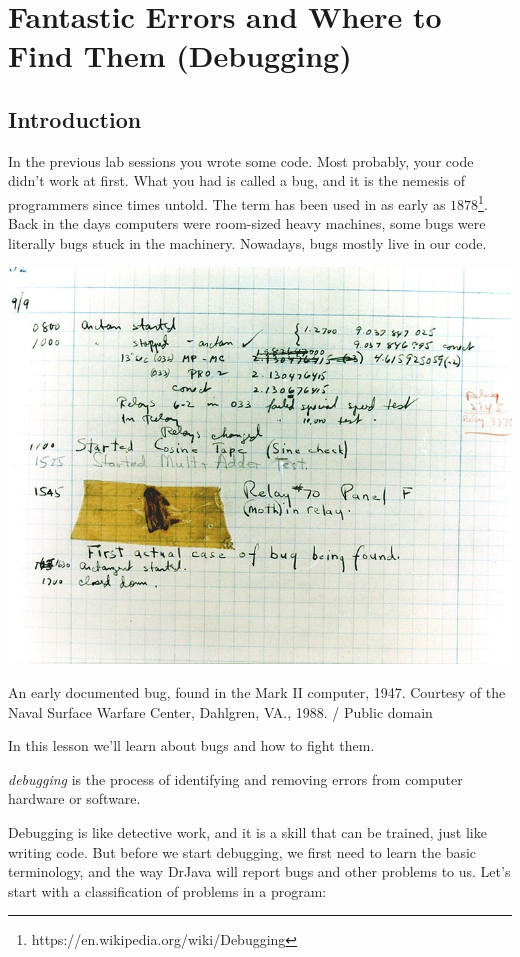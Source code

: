 \chapter{Fantastic Errors and Where to Find Them (Debugging)}

\section{Introduction}

In the previous lab sessions you wrote some code. Most probably, your code didn't work at first. What you had is called a bug, and it is the nemesis of programmers since times untold. The term has been used in as early as $1878$\footnote{https://en.wikipedia.org/wiki/Debugging}. Back in the days computers were room-sized heavy machines, some bugs were literally bugs stuck in the machinery. Nowadays, bugs mostly live in our code.

\begin{marginfigure}
\centering
\includegraphics[width=.9\linewidth]{lectures/images/bug.jpg}
\caption{An early documented bug, found in the Mark II computer, 1947. Courtesy of the Naval Surface Warfare Center, Dahlgren, VA., 1988. / Public domain}
\end{marginfigure}

In this lesson we'll learn about bugs and how to fight them. 

\begin{definition}
\emph{debugging} is the process of identifying and removing errors from computer hardware or software.
\end{definition}

Debugging is like detective work, and it is a skill that can be trained, just like writing code. But before we start debugging, we first need to learn the basic terminology, and the way DrJava will report bugs and other problems to us. Let's start with a classification of problems in a program:

